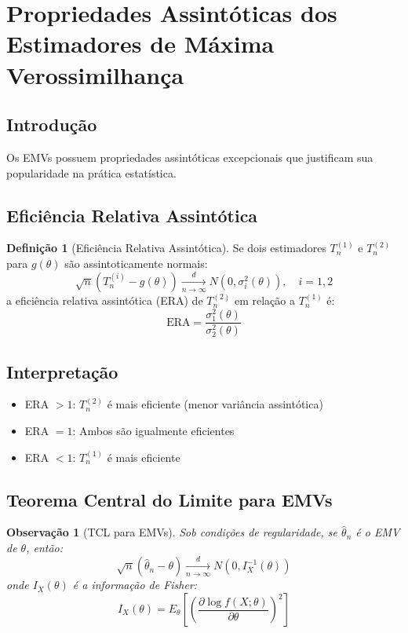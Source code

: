 \documentclass[12pt,a4paper]{article}
\theoremstyle{definition}
\newtheorem{definicao}{Definição}[section]
\theoremstyle{plain}
\newtheorem{observacao}{Observação}[section]
\begin{document}
\section{Propriedades Assintóticas dos Estimadores de Máxima Verossimilhança}

\subsection{Introdução}

Os EMVs possuem propriedades assintóticas excepcionais que justificam sua popularidade na prática estatística.

\subsection{Eficiência Relativa Assintótica}

\begin{definicao}[Eficiência Relativa Assintótica]
Se dois estimadores $T_n^{(1)}$ e $T_n^{(2)}$ para $g(\theta)$ são assintoticamente normais:
\[
\sqrt{n}(T_n^{(i)} - g(\theta)) \xrightarrow[n \to \infty]{d} N(0, \sigma_i^2(\theta)), \quad i = 1, 2
\]
a eficiência relativa assintótica (ERA) de $T_n^{(2)}$ em relação a $T_n^{(1)}$ é:
\[
\text{ERA} = \frac{\sigma_1^2(\theta)}{\sigma_2^2(\theta)}
\]
\end{definicao}

\subsection{Interpretação}

\begin{itemize}
    \item ERA $> 1$: $T_n^{(2)}$ é mais eficiente (menor variância assintótica)
    \item ERA $= 1$: Ambos são igualmente eficientes
    \item ERA $< 1$: $T_n^{(1)}$ é mais eficiente
\end{itemize}

\subsection{Teorema Central do Limite para EMVs}

\begin{observacao}[TCL para EMVs]
Sob condições de regularidade, se $\hat{\theta}_n$ é o EMV de $\theta$, então:
\[
\sqrt{n}(\hat{\theta}_n - \theta) \xrightarrow[n \to \infty]{d} N(0, I_X^{-1}(\theta))
\]
onde $I_X(\theta)$ é a informação de Fisher:
\[
I_X(\theta) = E_\theta\left[\left(\frac{\partial \log f(X; \theta)}{\partial \theta}\right)^2\right]
\]
\end{observacao}
\end{document}
